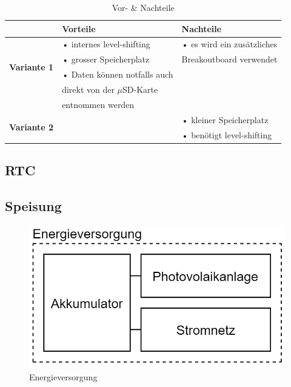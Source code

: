\begin{table}[h]
  \centering
  \label{tab:datenspeicherung}
  \small
  \caption{Vor- \& Nachteile}
    \begin{tabular}{c|l|l}
          & \textbf{Vorteile} & \textbf{Nachteile} \\
    \toprule
    \multirow{4}[2]{*}{\textbf{Variante 1}} & • internes level-shifting & • es wird ein zusätzliches \\
          & • grosser Speicherplatz & \hspace{0.3cm}Breakoutboard verwendet \\
          & • Daten können notfalls auch &  \\
          &   \hspace{0.3cm} direkt von der $\mu$SD-Karte &  \\
          &   \hspace{0.3cm} entnommen werden &  \\
    \hline
    \multirow{2}[1]{*}{\textbf{Variante 2}} &       & • kleiner Speicherplatz \\
          &       & • benötigt level-shifting \\
    \end{tabular}%
  \label{tab:addlabel}%
\end{table}%


\subsection{RTC}

\subsection{Speisung}
\begin{figure}[h]
\centering
\includegraphics[scale=0.6]{graphics/Energieversorgung.PNG}
\caption{Energieversorgung}
\end{figure}
